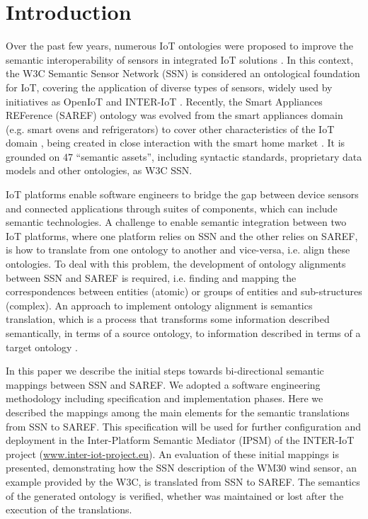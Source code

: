 \documentclass{sig-alternate-05-2015}
\begin{document}
\section{Introduction}

Over the past few years, numerous IoT ontologies were proposed to improve the semantic interoperability of sensors in integrated IoT solutions \cite{Ganzha2016a}. In this context, the W3C Semantic Sensor Network (SSN) is considered an ontological foundation for IoT, covering the application of diverse types of sensors, widely used by initiatives as OpenIoT and INTER-IoT \cite{Ganzha2017a}. 
Recently, the Smart Appliances REFerence (SAREF) ontology was evolved from the smart appliances domain (e.g. smart ovens and refrigerators) \cite{Daniele2015} to cover other characteristics of the IoT domain \cite{Daniele2016b}, being created in close interaction with the smart home market \cite{Daniele2016}. It is grounded on 47 “semantic assets”, including syntactic standards, proprietary data models and other ontologies, as W3C SSN. 

IoT platforms enable software engineers to bridge the gap between device sensors and connected applications through suites of components, which can include semantic technologies. A challenge to enable semantic integration between two IoT platforms, where one platform relies on SSN and the other relies on SAREF, is how to translate from one ontology to another and vice-versa, i.e. align these ontologies. To deal with this problem, the development of ontology alignments between SSN and SAREF is required, i.e. finding and mapping the correspondences between entities (atomic) or groups of entities and sub-structures (complex). An approach to implement ontology alignment is semantics translation, which is a process that transforms some information described semantically, in terms of a source ontology, to information described in terms of a target ontology \cite{Ganzha2015}. 

In this paper we describe the initial steps towards bi-directional semantic mappings between SSN and SAREF. We adopted a software engineering methodology including specification and implementation phases. Here we described the mappings among the main elements for the semantic translations from SSN to SAREF. This specification will be used for further configuration and deployment in the Inter-Platform Semantic Mediator (IPSM) of the INTER-IoT project (\url{www.inter-iot-project.eu}). An evaluation of these initial mappings is presented, demonstrating how the SSN description of the WM30 wind sensor, an example provided by the W3C, is translated from SSN to SAREF. The semantics of the generated ontology is verified, whether was maintained or lost after the execution of the translations. 
\end{document}
